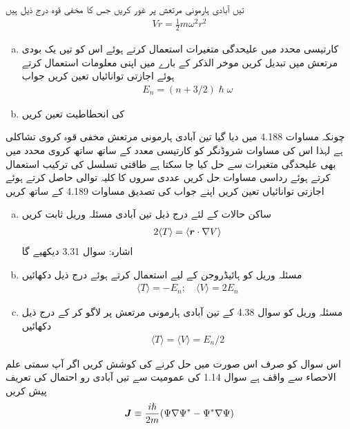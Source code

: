 تیں آبادی ہارمونی مرتعش پر غور کریں جس کا مخفی قوہ درج ذیل ہیں 
\begin{align}
V r = \frac{1}{2} m \omega^2 r^2
\end{align}
\begin{enumerate}[a.]
\item
کارتیسی محدد میں علیحدگی متغیرات استعمال کرتے ہوئے اس کو تیں یک بودی مرتعش میں تبدیل کریں موخر الذکر کے بارے میں اپنی معلومات استعمال کرتے ہوئے اجازتی توانائیاں تعین کریں جواب 
\begin{align}
E_n = (n + 3/2) \hslash \omega
\end{align}
\item
{} کی انحطاطيت  تعین کریں 
\end{enumerate}
چونکہ مساوات 4.188 میں دیا گیا تین آبادی ہارمونی مرتعش مخفی قوہ کروی تشاکلی ہے لہذا اس کی مساوات شروڈنگر کو کارتیسی معدد کے ساتھ ساتھ کروی محدد میں بھی علیحدگی  متغیرات سے حل کیا جا سکتا ہے طاقتی تسلسل کی ترکیب استعمال کرتے ہوئے رداسی مساوات حل کریں عددی سروں کا کلیہ توالی حاصل کرتے ہوئے اجازتی توانائیاں تعین کریں اپنے جواب کی تصدیق مساوات 4.189 کے ساتھ کریں 
\begin{enumerate}[a.]
\item
ساکن حالات کے لئے درج ذیل تین آبادی مسئلہ وریل ثابت کریں 
\begin{align}
2 \langle T \rangle = \langle {\ensuremath{{\boldsymbol{r}}}} \cdot \nabla V \rangle
\end{align}
اشارہ: سوال 3.31 دیکھیے گا 
\item
مسئلہ وریل کو ہائیڈروجن کے لیے استعمال کرتے ہوئے درج ذیل دکھائیں 
\begin{align}
\langle T \rangle = - E_n; \quad \langle V \rangle = 2 E_n
\end{align}
\item
مسئلہ وریل کو سوال 4.38 کے تین آبادی ہارمونی مرتعش پر لاگو کر کے درج ذیل دکھائیں 
\begin{align}
\langle T \rangle = \langle V \rangle = E_n /2
\end{align}
\end{enumerate}
اس سوال کو صرف اس صورت میں حل کرنے کی کوشش کریں اگر آپ سمتی علم الاحصاء سے واقف ہے سوال 1.14 کی عمومیت سے تیں آبادی رو احتمال کی تعریف پیش کریں 
\begin{align}
{\ensuremath{{\boldsymbol{J}}}} \equiv \frac{i \hslash}{2 m} (\Psi \nabla \Psi^* - \Psi^* \nabla \Psi)
\end{align}
